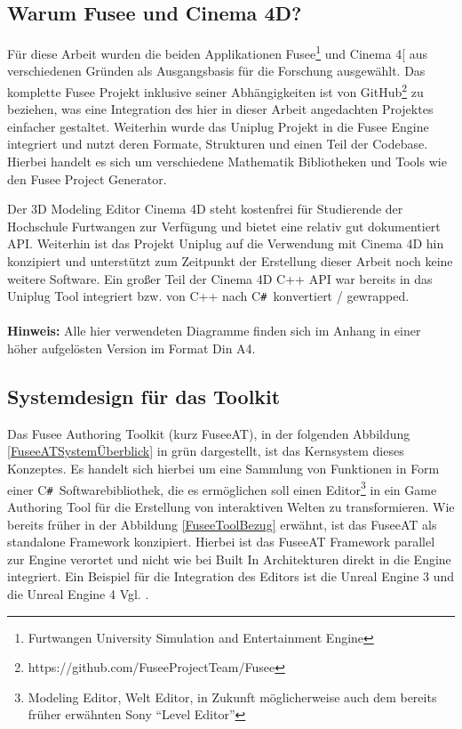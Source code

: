 \documentclass[pagesize, paper=a4, fontsize=12pt, titlepage=true, headings=small, headnosepline, abstractoff, liststotoc, nochapterprefix, plainheadsepline, twoside]{scrreprt}
\newcommand{\CSS}{C\texttt{\# }}
\begin{document}
\subsection{Warum Fusee und Cinema 4D?}
Für diese Arbeit wurden die beiden Applikationen Fusee\footnote{Furtwangen University Simulation and Entertainment Engine} und Cinema 4[\autocite{MaxonC4d2014} aus verschiedenen Gründen als Ausgangsbasis für die Forschung ausgewählt. Das komplette Fusee Projekt inklusive seiner Abhängigkeiten ist von GitHub\footnote{https://github.com/FuseeProjectTeam/Fusee} zu beziehen, was eine Integration des hier in dieser Arbeit angedachten Projektes einfacher gestaltet. Weiterhin wurde das Uniplug Projekt in die Fusee Engine integriert und nutzt deren Formate, Strukturen und einen Teil der Codebase. Hierbei handelt es sich um verschiedene Mathematik Bibliotheken und Tools wie den Fusee Project Generator.

Der 3D Modeling Editor Cinema 4D steht kostenfrei für Studierende der Hochschule Furtwangen zur Verfügung und bietet eine relativ gut dokumentiert API. Weiterhin ist das Projekt Uniplug auf die Verwendung mit Cinema 4D hin konzipiert und unterstützt zum Zeitpunkt der Erstellung dieser Arbeit noch keine weitere Software. Ein großer Teil der Cinema 4D C++ API war bereits in das Uniplug Tool integriert bzw. von C++ nach \CSS konvertiert / gewrapped.
\\
\\
\textbf{Hinweis:} Alle hier verwendeten Diagramme finden sich im Anhang in einer höher aufgelösten Version im Format Din A4.

\subsection{Systemdesign für das Toolkit}
Das Fusee Authoring Toolkit (kurz FuseeAT), in der folgenden Abbildung \ref{FuseeATSystemÜberblick} in grün dargestellt, ist das Kernsystem dieses Konzeptes. Es handelt sich hierbei um eine Sammlung von Funktionen in Form einer \CSS Softwarebibliothek, die es ermöglichen soll einen Editor\footnote{Modeling Editor, Welt Editor, in Zukunft  möglicherweise auch dem bereits früher erwähnten Sony “Level Editor”} in ein Game Authoring Tool für die Erstellung von interaktiven Welten zu transformieren. Wie bereits früher in der Abbildung \ref{FuseeToolBezug} erwähnt, ist das FuseeAT als standalone Framework konzipiert. Hierbei ist das FuseeAT Framework parallel zur Engine verortet und nicht wie bei Built In Architekturen direkt in die Engine integriert. Ein Beispiel für die Integration des Editors ist die Unreal Engine 3 und die Unreal Engine 4 Vgl. \parencite[S. 54-55]{Gregory2009}.
\end{document}
